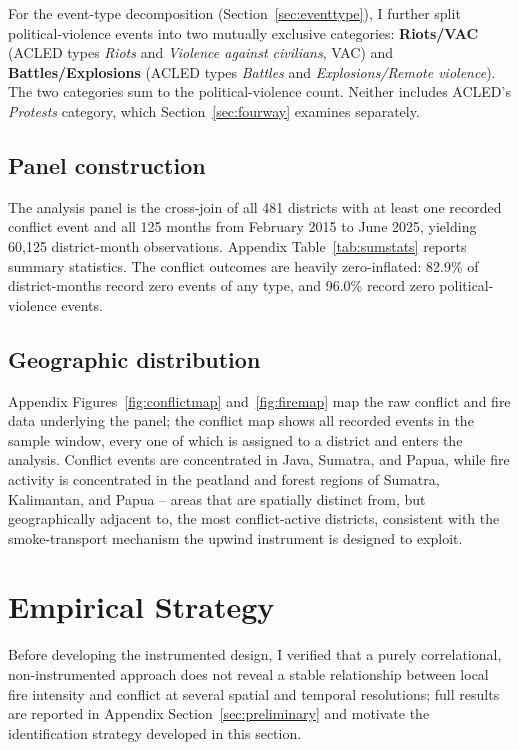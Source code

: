 \documentclass[12pt]{article}
\begin{document}
For the event-type decomposition (Section~\ref{sec:eventtype}), I further split political-violence events into two mutually exclusive categories: \textbf{Riots/VAC} (ACLED types \emph{Riots} and \emph{Violence against civilians}, VAC) and \textbf{Battles/Explosions} (ACLED types \emph{Battles} and \emph{Explosions/Remote violence}). The two categories sum to the political-violence count. Neither includes ACLED's \emph{Protests} category, which Section~\ref{sec:fourway} examines separately.

\subsection{Panel construction}

The analysis panel is the cross-join of all 481 districts with at least one recorded conflict event and all 125 months from February 2015 to June 2025, yielding 60{,}125 district-month observations. Appendix Table~\ref{tab:sumstats} reports summary statistics. The conflict outcomes are heavily zero-inflated: 82.9\% of district-months record zero events of any type, and 96.0\% record zero political-violence events.

\subsection{Geographic distribution}

Appendix Figures~\ref{fig:conflictmap} and~\ref{fig:firemap} map the raw conflict and fire data underlying the panel; the conflict map shows all recorded events in the sample window, every one of which is assigned to a district and enters the analysis. Conflict events are concentrated in Java, Sumatra, and Papua, while fire activity is concentrated in the peatland and forest regions of Sumatra, Kalimantan, and Papua -- areas that are spatially distinct from, but geographically adjacent to, the most conflict-active districts, consistent with the smoke-transport mechanism the upwind instrument is designed to exploit.

\section{Empirical Strategy}
\label{sec:empirical}

Before developing the instrumented design, I verified that a purely correlational, non-instrumented approach does not reveal a stable relationship between local fire intensity and conflict at several spatial and temporal resolutions; full results are reported in Appendix Section~\ref{sec:preliminary} and motivate the identification strategy developed in this section.
\end{document}
